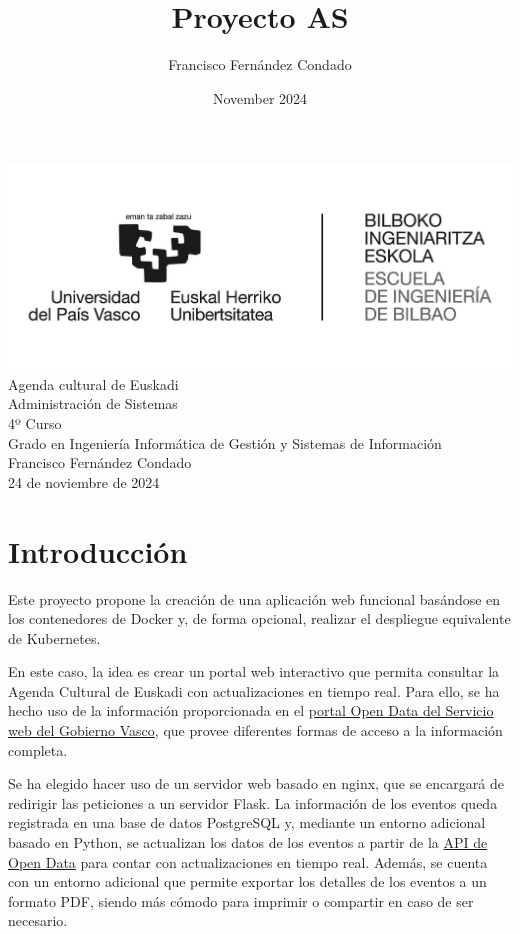 \documentclass{report}
\title{Proyecto AS}
\author{Francisco Fernández Condado}
\date{November 2024}
\begin{document}
    \begin{titlepage}
        \centering
        \includegraphics[width=0.7\linewidth]{img/bie.jpg}\\
        \vspace{3.5cm}
        \Huge Agenda cultural de Euskadi\\
        \vspace{2.5cm}
        \Large Administración de Sistemas\\
        \vspace{0.5cm}
        \large 4º Curso\\
        \vspace{3cm}
        \LARGE Grado en Ingeniería Informática de Gestión y Sistemas de Información\\
        \vspace{1cm}
        \large Francisco Fernández Condado\\
        \vspace{0.5cm}
        \large 24 de noviembre de 2024\\
    \end{titlepage}
    
    \tableofcontents
    
    \chapter{Introducción}
        Este proyecto propone la creación de una aplicación web funcional basándose en los contenedores de Docker y, de forma opcional, realizar el despliegue equivalente de Kubernetes.

        En este caso, la idea es crear un portal web interactivo que permita consultar la Agenda Cultural de Euskadi con actualizaciones en tiempo real. Para ello, se ha hecho uso de la información proporcionada en el \href{https://opendata.euskadi.eus/catalogo/-/kulturklik-agenda-cultural/}{portal Open Data del Servicio web del Gobierno Vasco}, que provee diferentes formas de acceso a la información completa.

        Se ha elegido hacer uso de un servidor web basado en nginx, que se encargará de redirigir las peticiones a un servidor Flask. La información de los eventos queda registrada en una base de datos PostgreSQL y, mediante un entorno adicional basado en Python, se actualizan los datos de los eventos a partir de la \href{https://opendata.euskadi.eus/apis/-/apis-open-data/}{API de Open Data} para contar con actualizaciones en tiempo real. Además, se cuenta con un entorno adicional que permite exportar los detalles de los eventos a un formato PDF, siendo más cómodo para imprimir o compartir en caso de ser necesario.
\end{document}
